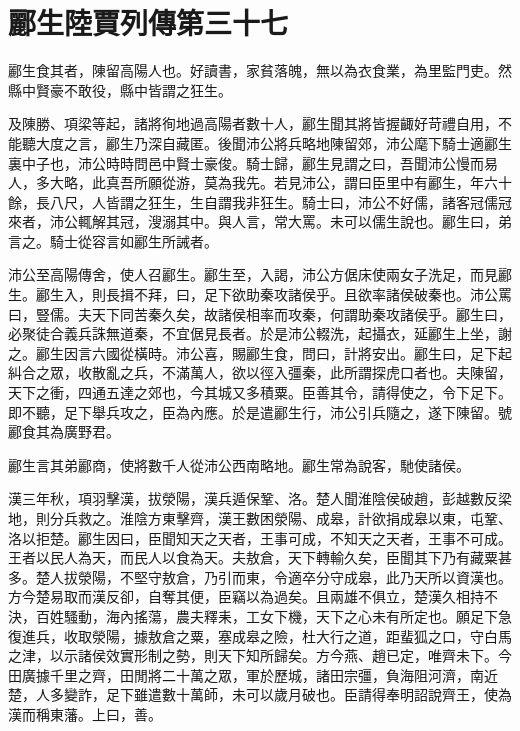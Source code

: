 \chapter{酈生陸賈列傳第三十七}

酈生食其者，陳留高陽人也。好讀書，家貧落魄，無以為衣食業，為里監門吏。然縣中賢豪不敢役，縣中皆謂之狂生。

及陳勝、項梁等起，諸將徇地過高陽者數十人，酈生聞其將皆握齱好苛禮自用，不能聽大度之言，酈生乃深自藏匿。後聞沛公將兵略地陳留郊，沛公麾下騎士適酈生裏中子也，沛公時時問邑中賢士豪俊。騎士歸，酈生見謂之曰，吾聞沛公慢而易人，多大略，此真吾所願從游，莫為我先。若見沛公，謂曰臣里中有酈生，年六十餘，長八尺，人皆謂之狂生，生自謂我非狂生。騎士曰，沛公不好儒，諸客冠儒冠來者，沛公輒解其冠，溲溺其中。與人言，常大罵。未可以儒生說也。酈生曰，弟言之。騎士從容言如酈生所誡者。

沛公至高陽傳舍，使人召酈生。酈生至，入謁，沛公方倨床使兩女子洗足，而見酈生。酈生入，則長揖不拜，曰，足下欲助秦攻諸侯乎。且欲率諸侯破秦也。沛公罵曰，豎儒。夫天下同苦秦久矣，故諸侯相率而攻秦，何謂助秦攻諸侯乎。酈生曰，必聚徒合義兵誅無道秦，不宜倨見長者。於是沛公輟洗，起攝衣，延酈生上坐，謝之。酈生因言六國從橫時。沛公喜，賜酈生食，問曰，計將安出。酈生曰，足下起糾合之眾，收散亂之兵，不滿萬人，欲以徑入彊秦，此所謂探虎口者也。夫陳留，天下之衝，四通五達之郊也，今其城又多積粟。臣善其令，請得使之，令下足下。即不聽，足下舉兵攻之，臣為內應。於是遣酈生行，沛公引兵隨之，遂下陳留。號酈食其為廣野君。

酈生言其弟酈商，使將數千人從沛公西南略地。酈生常為說客，馳使諸侯。

漢三年秋，項羽擊漢，拔滎陽，漢兵遁保鞏、洛。楚人聞淮陰侯破趙，彭越數反梁地，則分兵救之。淮陰方東擊齊，漢王數困滎陽、成皋，計欲捐成皋以東，屯鞏、洛以拒楚。酈生因曰，臣聞知天之天者，王事可成，不知天之天者，王事不可成。王者以民人為天，而民人以食為天。夫敖倉，天下轉輸久矣，臣聞其下乃有藏粟甚多。楚人拔滎陽，不堅守敖倉，乃引而東，令適卒分守成皋，此乃天所以資漢也。方今楚易取而漢反卻，自奪其便，臣竊以為過矣。且兩雄不俱立，楚漢久相持不決，百姓騷動，海內搖蕩，農夫釋耒，工女下機，天下之心未有所定也。願足下急復進兵，收取滎陽，據敖倉之粟，塞成皋之險，杜大行之道，距蜚狐之口，守白馬之津，以示諸侯效實形制之勢，則天下知所歸矣。方今燕、趙已定，唯齊未下。今田廣據千里之齊，田閒將二十萬之眾，軍於歷城，諸田宗彊，負海阻河濟，南近楚，人多變詐，足下雖遣數十萬師，未可以歲月破也。臣請得奉明詔說齊王，使為漢而稱東藩。上曰，善。

